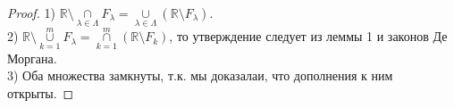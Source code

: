     \begin{proof}
        1) $\mathds{R} \setminus \underset{\lambda \in \Lambda}{\cap} F_{\lambda} = \underset{\lambda \in \Lambda}{\cup} (\mathds{R} \setminus F_{\lambda})$.
        \\
        2) $\mathds{R} \setminus \overset{m}{\underset{k = 1}{\cup}} F_{\lambda} = \overset{m}{\underset{k = 1}{\cap}} (\mathds{R} \setminus F_{k})$, то утверждение следует из леммы 1 и законов Де Моргана.
        \\
        3) Оба множества замкнуты, т.к. мы доказалаи, что дополнения к ним открыты.
    \end{proof}
    